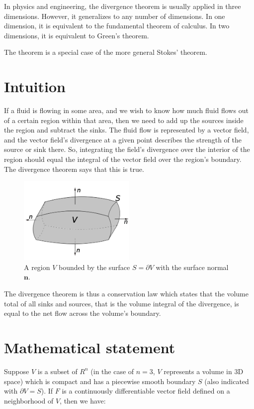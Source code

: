 \documentclass{cgdrepen}
\begin{document}
In physics and engineering, the divergence theorem is usually applied in three dimensions.
However, it generalizes to any number of dimensions. 
In one dimension, it is equivalent to the fundamental theorem of calculus.
In two dimensions, it is equivalent to Green's theorem.

The theorem is a special case of the more general Stokes' theorem.

\section{Intuition}
If a fluid is flowing in some area, and we wish to know how much fluid flows
out of a certain region within that area, then we need to add up the sources 
inside the region and subtract the sinks. The fluid flow is represented by a
vector field, and the vector field's divergence at a given point describes 
the strength of the source or sink there. So, integrating the field's divergence
 over the interior of the region should equal the integral of the vector field 
over the region's boundary. The divergence theorem says that this is true.

\begin{figure}[htbp]
\centering
\includegraphics[width=0.5\textwidth]{Divergence_theorem.png} 
\caption{\label{fig:div_theorem}%
A region $V$ bounded by the surface $S=\partial V$ with the surface normal $\mathbf{n}$.}
\end{figure}

The divergence theorem is thus a conservation law which states that the volume
total of all sinks and sources, that is the volume integral of the divergence,
is equal to the net flow across the volume's boundary.

\section{Mathematical statement}
Suppose $V$ is a subset of $R^n$ (in the case of $n = 3$, $V$ represents a volume 
in 3D space) which is compact and has a piecewise smooth boundary $S$ 
(also indicated with $\partial V=S$). 
If $F$ is a continuously differentiable vector field defined on a neighborhood of $V$,
then we have:
\end{document}
